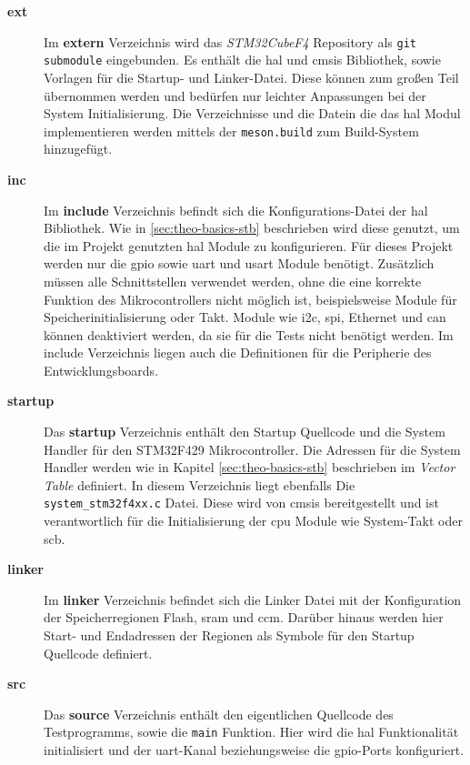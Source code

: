 \begin{description}
    \item[\textbf{ext}]
        Im \textbf{extern} Verzeichnis wird das \textit{STM32CubeF4} Repository
        als \texttt{git submodule} eingebunden.
        Es enthält die \ac{hal} und \ac{cmsis} Bibliothek, sowie Vorlagen für
        die Startup- und Linker-Datei.
        Diese können zum großen Teil übernommen werden und bedürfen nur
        leichter Anpassungen bei der System Initialisierung.
        Die Verzeichnisse und die Datein die das \ac{hal} Modul implementieren
        werden mittels der \texttt{meson.build} zum Build-System hinzugefügt.
    \item[\textbf{inc}]
        Im \textbf{include} Verzeichnis befindt sich die Konfigurations-Datei
        der \ac{hal} Bibliothek.
        Wie in \ref{sec:theo-basics-stb} beschrieben wird diese genutzt, um die
        im Projekt genutzten \ac{hal} Module zu konfigurieren.
        Für dieses Projekt werden nur die \ac{gpio} sowie \ac{uart} und
        \ac{usart} Module benötigt.
        Zusätzlich müssen alle Schnittstellen verwendet werden, ohne die eine
        korrekte Funktion des Mikrocontrollers nicht möglich ist,
        beispielsweise Module für Speicherinitialisierung oder Takt.
        Module wie \acs{i2c}, \acs{spi}, Ethernet und \ac{can} können
        deaktiviert werden, da sie für die Tests nicht benötigt werden.
        Im include Verzeichnis liegen auch die Definitionen für die Peripherie
        des Entwicklungsboards.
    \item[\textbf{startup}]
        Das \textbf{startup} Verzeichnis enthält den Startup Quellcode und die
        System Handler für den STM32F429 Mikrocontroller.
        Die Adressen für die System Handler werden wie in Kapitel
        \ref{sec:theo-basics-stb} beschrieben im \textit{Vector Table}
        definiert.
        In diesem Verzeichnis liegt ebenfalls Die \texttt{system\_stm32f4xx.c} Datei.
        Diese wird von \ac{cmsis} bereitgestellt und ist verantwortlich für die
        Initialisierung der \ac{cpu} Module wie System-Takt oder \ac{scb}.
    \item[\textbf{linker}]
        Im \textbf{linker} Verzeichnis befindet sich die Linker Datei mit der
        Konfiguration der Speicherregionen Flash, \ac{sram} und \ac{ccm}.
        Darüber hinaus werden hier Start- und Endadressen der Regionen als
        Symbole für den Startup Quellcode definiert.
    \item[\textbf{src}]
        Das \textbf{source} Verzeichnis enthält den eigentlichen Quellcode des
        Testprogramms, sowie die \texttt{main} Funktion.
        Hier wird die \ac{hal} Funktionalität initialisiert und der
        \ac{uart}-Kanal beziehungsweise die \ac{gpio}-Ports konfiguriert.
\end{description}

